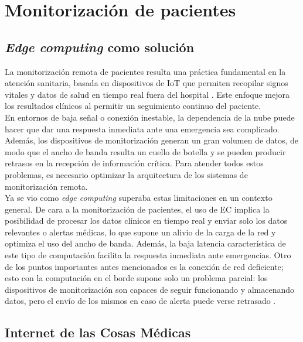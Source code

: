 \documentclass[twoside, 12pt]{opticajnl}
\begin{document}
\section{Monitorización de pacientes}

\subsection{\textit{Edge computing} como solución}

La monitorización remota de pacientes resulta una práctica fundamental en la atención sanitaria, basada en dispositivos de IoT que permiten recopilar signos vitales y datos de salud en tiempo real fuera del hospital . Este enfoque mejora los resultados clínicos al permitir un seguimiento continuo del paciente. \\

En entornos de baja señal o conexión inestable, la dependencia de la nube puede hacer que dar una respuesta inmediata ante una emergencia sea complicado. Además, los dispositivos de monitorización generan un gran volumen de datos, de modo que el ancho de banda resulta un cuello de botella y se pueden producir retrasos en la recepción de información crítica. Para atender todos estos problemas, es necesario optimizar la arquitectura de los sistemas de monitorización remota. \\

Ya se vio como \textit{edge computing} superaba estas limitaciones en un contexto general. De cara a la monitorización de pacientes, el uso de EC implica la posibilidad de procesar los datos clínicos en tiempo real y enviar solo los datos relevantes o alertas médicas, lo que supone un alivio de la carga de la red y optimiza el uso del ancho de banda. Además, la baja latencia característica de este tipo de computación facilita la respuesta inmediata ante emergencias. Otro de los puntos importantes antes mencionados es la conexión de red deficiente; esto con la computación en el borde supone solo un problema parcial: los dispositivos de monitorización son capaces de seguir funcionando y almacenando datos, pero el envío de los mismos en caso de alerta puede verse retrasado .  


\subsection{Internet de las Cosas Médicas}
\end{document}
